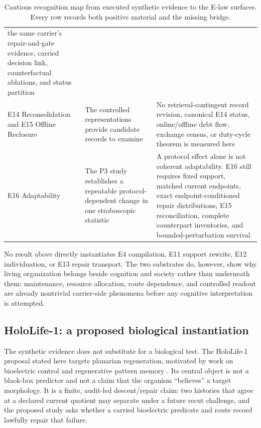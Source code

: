\begin{table}[htbp]
\begin{tabularx}{\textwidth}{@{}lXX@{}}
the same carrier's repair-and-gate evidence, carried decision link,
counterfactual ablations, and status partition \\
E14 Reconsolidation and E15 Offline Reclosure &
The controlled representations provide candidate
records to examine &
No retrieval-contingent record revision, canonical E14 status, online/offline
debt flow, exchange census, or duty-cycle theorem is measured here \\
E16 Adaptability &
The P3 study establishes a repeatable protocol-dependent change in one
stroboscopic statistic &
A protocol effect alone is not coherent adaptability.  E16 still requires
fixed support, matched current endpoints, exact endpoint-conditioned repair
distributions, E15 reconciliation, complete counterpart inventories, and
bounded-perturbation survival \\
\bottomrule
\end{tabularx}
\caption{Cautious recognition map from executed synthetic evidence to the
E-law surfaces.  Every row records both positive material and the missing
bridge.}
\label{tab:life-e-law-map}
\end{table}

No result above directly instantiates E4 compilation, E11 support rewrite,
E12 individuation, or E13 repair transport.  The two substrates do,
however, show why living organization belongs beside cognition and society
rather than underneath them: maintenance, resource allocation, route
dependence, and controlled readout are already nontrivial carrier-side
phenomena before any cognitive interpretation is attempted.

\subsection{HoloLife-1: a proposed biological instantiation}
\label{sec:hololife-protocol}

The synthetic evidence does not substitute for a biological test.  The
HoloLife-1 proposal stated here targets planarian regeneration, motivated by
work on bioelectric control and regenerative pattern memory
\citep{PezzuloLevin2015}.  Its central object is not a black-box predictor and
not a claim that the organism ``believes'' a target morphology.  It is a
finite, audit-led descent/repair claim: two histories that agree at a
declared current quotient may separate under a future recut challenge, and
the proposed study asks whether a carried bioelectric predicate and route
record lawfully repair that failure.

